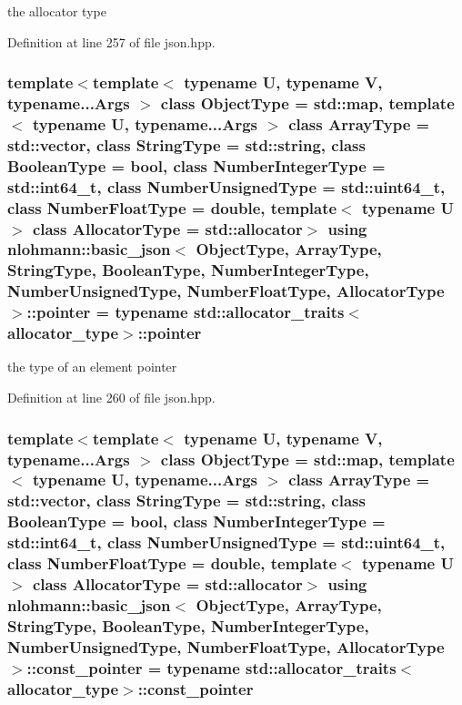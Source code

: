 the allocator type 



Definition at line 257 of file json.\+hpp.

\hypertarget{classnlohmann_1_1basic__json_a9d1b58099dc64695fcf2847ab0b2a7c7}{}
\subsubsection[{pointer}]{\setlength{\rightskip}{0pt plus 5cm}template$<$template$<$ typename U, typename V, typename...\+Args $>$ class Object\+Type = std\+::map, template$<$ typename U, typename...\+Args $>$ class Array\+Type = std\+::vector, class String\+Type  = std\+::string, class Boolean\+Type  = bool, class Number\+Integer\+Type  = std\+::int64\+\_\+t, class Number\+Unsigned\+Type  = std\+::uint64\+\_\+t, class Number\+Float\+Type  = double, template$<$ typename U $>$ class Allocator\+Type = std\+::allocator$>$ using {\bf nlohmann\+::basic\+\_\+json}$<$ Object\+Type, Array\+Type, String\+Type, Boolean\+Type, Number\+Integer\+Type, Number\+Unsigned\+Type, Number\+Float\+Type, Allocator\+Type $>$\+::{\bf pointer} =  typename std\+::allocator\+\_\+traits$<${\bf allocator\+\_\+type}$>$\+::{\bf pointer}}\label{classnlohmann_1_1basic__json_a9d1b58099dc64695fcf2847ab0b2a7c7}


the type of an element pointer 



Definition at line 260 of file json.\+hpp.

\hypertarget{classnlohmann_1_1basic__json_a06efb200b69942eacd1ea22d0f6ccebb}{}
\subsubsection[{const\+\_\+pointer}]{\setlength{\rightskip}{0pt plus 5cm}template$<$template$<$ typename U, typename V, typename...\+Args $>$ class Object\+Type = std\+::map, template$<$ typename U, typename...\+Args $>$ class Array\+Type = std\+::vector, class String\+Type  = std\+::string, class Boolean\+Type  = bool, class Number\+Integer\+Type  = std\+::int64\+\_\+t, class Number\+Unsigned\+Type  = std\+::uint64\+\_\+t, class Number\+Float\+Type  = double, template$<$ typename U $>$ class Allocator\+Type = std\+::allocator$>$ using {\bf nlohmann\+::basic\+\_\+json}$<$ Object\+Type, Array\+Type, String\+Type, Boolean\+Type, Number\+Integer\+Type, Number\+Unsigned\+Type, Number\+Float\+Type, Allocator\+Type $>$\+::{\bf const\+\_\+pointer} =  typename std\+::allocator\+\_\+traits$<${\bf allocator\+\_\+type}$>$\+::{\bf const\+\_\+pointer}}\label{classnlohmann_1_1basic__json_a06efb200b69942eacd1ea22d0f6ccebb}


